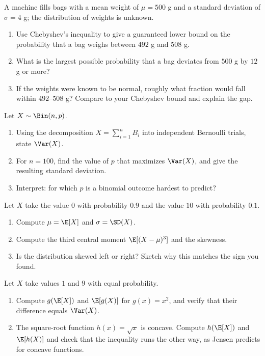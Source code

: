 \begin{exercise}
\label{ch09:exr-cheby}
A machine fills bags with a mean weight of $\mu = 500$ g and a standard
deviation of $\sigma = 4$ g; the distribution of weights is unknown.
\begin{enumerate}
  \item Use Chebyshev's inequality to give a guaranteed lower bound on the
        probability that a bag weighs between $492$ g and $508$ g.
  \item What is the largest possible probability that a bag deviates from
        $500$ g by $12$ g or more?
  \item If the weights were known to be normal, roughly what fraction would
        fall within $492$--$508$ g? Compare to your Chebyshev bound and explain
        the gap.
\end{enumerate}
\end{exercise}

\begin{exercise}
\label{ch09:exr-binom}
Let $X \sim \Bin(n,p)$.
\begin{enumerate}
  \item Using the decomposition $X = \sum_{i=1}^n B_i$ into independent
        Bernoulli trials, state $\Var(X)$.
  \item For $n = 100$, find the value of $p$ that maximizes $\Var(X)$, and
        give the resulting standard deviation.
  \item Interpret: for which $p$ is a binomial outcome hardest to predict?
\end{enumerate}
\end{exercise}

\begin{exercise}
\label{ch09:exr-skew}
Let $X$ take the value $0$ with probability $0.9$ and the value $10$ with
probability $0.1$.
\begin{enumerate}
  \item Compute $\mu = \E[X]$ and $\sigma = \SD(X)$.
  \item Compute the third central moment $\E[(X-\mu)^3]$ and the skewness.
  \item Is the distribution skewed left or right? Sketch why this matches the
        sign you found.
\end{enumerate}
\end{exercise}

\begin{exercise}
\label{ch09:exr-jensen}
Let $X$ take values $1$ and $9$ with equal probability.
\begin{enumerate}
  \item Compute $g(\E[X])$ and $\E[g(X)]$ for $g(x) = x^2$, and verify that
        their difference equals $\Var(X)$.
  \item The square-root function $h(x) = \sqrt x$ is concave. Compute
        $h(\E[X])$ and $\E[h(X)]$ and check that the inequality runs the
        other way, as Jensen predicts for concave functions.
\end{enumerate}
\end{exercise}

